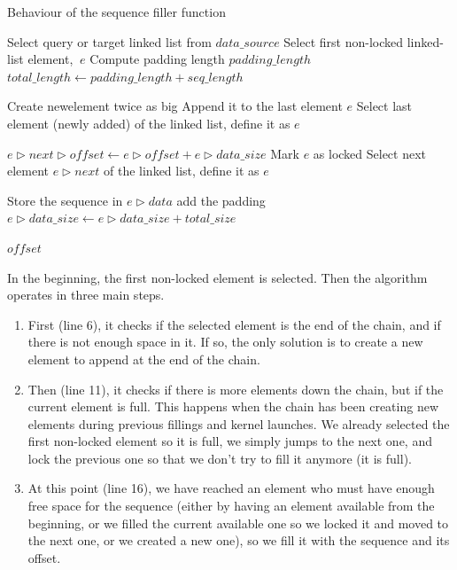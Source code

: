\begin{algorithm}[h!]
	\caption{Behaviour of the sequence filler function}
	\label{algo:extensiblefunction}
	\begin{algorithmic}[1] %
		
		\State Select query or target linked list from $data\_source$
		\State Select first non-locked linked-list element, $~e$
		\State Compute padding length $padding\_length$
		\State $total\_length \leftarrow padding\_length + seq\_length$
		
			\State Create new\rhd element twice as big
			\State Append it to the last element $e$
			\State Select last element (newly added) of the linked list, define it as $e$
		\EndIf
		
			\State $e\rhd next\rhd offset \leftarrow e\rhd offset + e\rhd data\_size $
			\State Mark $e$ as locked
			\State Select next element $e\rhd next$ of the linked list, define it as $e$
		\EndIf
		
			\State Store the sequence in $e\rhd data$ add the padding
			\State $e\rhd data\_size \leftarrow e\rhd data\_size + total\_size$
		
		
		\Return $offset$
		\EndFunction
		
	\end{algorithmic}
\end{algorithm}

In the beginning, the first non-locked element is selected. Then the algorithm operates in three main steps. 

\begin{enumerate}
	\item First (line 6), it checks if the selected element is the end of the chain, and if there is not enough space in it. If so, the only solution is to create a new element to append at the end of the chain.
	\item Then (line 11), it checks if there is more elements down the chain, but if the current element is full. This happens when the chain has been creating new elements during previous fillings and kernel launches. We already selected the first non-locked element so it is full, we simply jumps to the next one, and lock the previous one so that we don't try to fill it anymore (it is full).
	\item At this point (line 16), we have reached an element who must have enough free space for the sequence (either by having an element available from the beginning, or we filled the current available one so we locked it and moved to the next one, or we created a new one), so we fill it with the sequence and its offset.
\end{enumerate}

